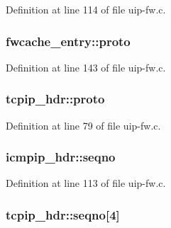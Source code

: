 Definition at line 114 of file uip-\/fw.c.

\hypertarget{group__uipfw_ga2be7b4f6413d75eefbe43529a9838fd6}{
\subsubsection[{proto}]{ {\bf fwcache\_\-entry::proto}}}
\label{group__uipfw_ga2be7b4f6413d75eefbe43529a9838fd6}


Definition at line 143 of file uip-\/fw.c.

\hypertarget{group__uipfw_gabf0603fa00a2effd2f79d8b3f36e9fb1}{
\subsubsection[{proto}]{ {\bf tcpip\_\-hdr::proto}}}
\label{group__uipfw_gabf0603fa00a2effd2f79d8b3f36e9fb1}


Definition at line 79 of file uip-\/fw.c.

\hypertarget{group__uipfw_gafa0d3607dd6825e880db0802824fc61c}{
\subsubsection[{seqno}]{ {\bf icmpip\_\-hdr::seqno}}}
\label{group__uipfw_gafa0d3607dd6825e880db0802824fc61c}


Definition at line 113 of file uip-\/fw.c.

\hypertarget{group__uipfw_gadb7d3ca80f0f4415f7d5f680c600904c}{
\subsubsection[{seqno}]{ {\bf tcpip\_\-hdr::seqno}\mbox{[}4\mbox{]}}}
\label{group__uipfw_gadb7d3ca80f0f4415f7d5f680c600904c}


